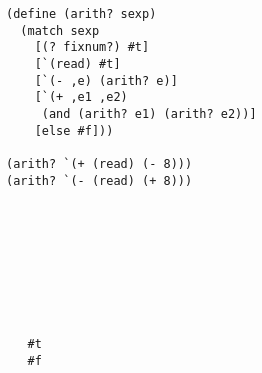 \documentclass[12pt]{book}
\begin{document}
\begin{center}
\begin{minipage}{0.7\textwidth}
\begin{lstlisting}
(define (arith? sexp)
  (match sexp
    [(? fixnum?) #t]
    [`(read) #t]
    [`(- ,e) (arith? e)]
    [`(+ ,e1 ,e2)
     (and (arith? e1) (arith? e2))]
    [else #f]))

(arith? `(+ (read) (- 8)))
(arith? `(- (read) (+ 8)))
\end{lstlisting}
\end{minipage}
\vrule
\begin{minipage}{0.25\textwidth}
\begin{lstlisting}








   #t
   #f
\end{lstlisting}
\end{minipage}
\end{center}






\end{document}
